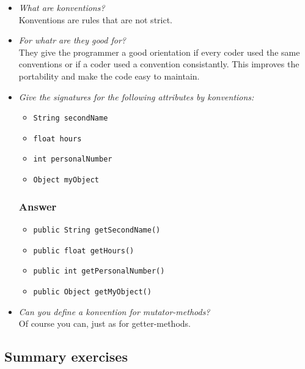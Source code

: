 \begin{itemize}
	\item \textit{What are konventions?} \\
		Konventions are rules that are not strict.
	\item \textit{For whatr are they good for?} \\
		They give the programmer a good orientation if every
		coder used the same conventions or if a coder used a
		convention consistantly. This improves the portability
		and make the code easy to maintain.
	\item \textit{Give the signatures for the following attributes
		by konventions:}
		\begin{itemize}
			\item \lstinline{String secondName}
			\item \lstinline{float hours}
			\item \lstinline{int personalNumber}
			\item \lstinline{Object myObject}
		\end{itemize}
	\subsubsection*{Answer}
		\begin{itemize}
			\item \lstinline{public String getSecondName()}
			\item \lstinline{public float getHours()}
			\item \lstinline{public int getPersonalNumber()}
			\item \lstinline{public Object getMyObject()}
		\end{itemize}
	\item \textit{Can you define a konvention for mutator-methods?} \\
		Of course you can, just as for getter-methods.
\end{itemize}


\subsection{Summary exercises}

